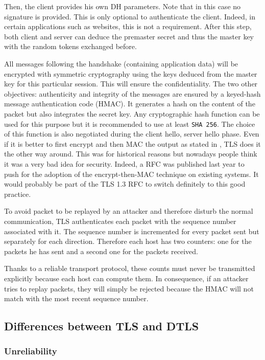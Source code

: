 Then, the client provides his own DH parameters. Note that in this case no signature is provided. This is only optional to authenticate the client. Indeed, in certain applications such as websites, this is not a requirement. After this step, both client and server can deduce the premaster secret and thus the master key with the random tokens exchanged before.

All messages following the handshake (containing application data) will be encrypted with symmetric cryptography using the keys deduced from the master key for this particular session. This will ensure the confidentiality. The two other objectives: authenticity and integrity of the messages are ensured by a keyed-hash message authentication code (HMAC). It generates a hash on the content of the packet but also integrates the secret key. Any cryptographic hash function can be used for this purpose but it is recommended to use at least \texttt{SHA 256}. The choice of this function is also negotiated during the client hello, server hello phase. Even if it is better to first encrypt and then MAC the output as stated in \cite{bellare2000authenticated}, TLS does it the other way around. This was for historical reasons but nowadays people think it was a very bad idea for security. Indeed, a RFC \cite{RFC7366} was published last year to push for the adoption of the encrypt-then-MAC technique on existing systems. It would probably be part of the TLS 1.3 RFC \cite{draft-tls13} to switch definitely to this good practice.


To avoid packet to be replayed by an attacker and therefore disturb the normal communication, TLS authenticates each packet with the sequence number associated with it. The sequence number is incremented for every packet sent but separately for each direction. Therefore each host has two counters: one for the packets he has sent and a second one for the packets received.

Thanks to a reliable transport protocol, these counts must never be transmitted explicitly because each host can compute them. In consequence, if an attacker tries to replay packets, they will simply be rejected because the HMAC will not match with the most recent sequence number.

\subsection{Differences between TLS and DTLS}

\subsubsection{Unreliability}

